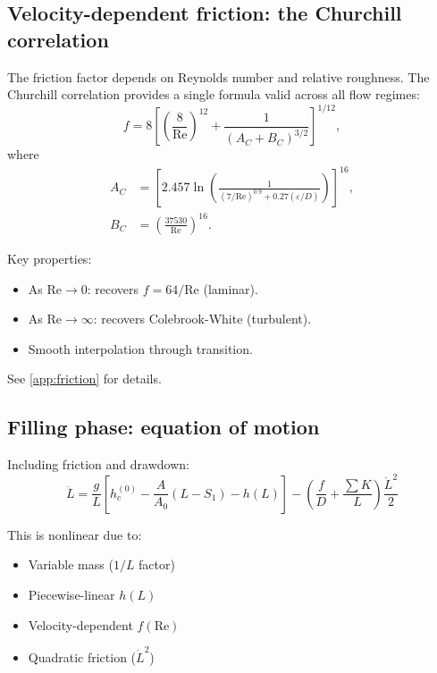 \documentclass[11pt]{article}
\begin{document}
\subsection{Velocity-dependent friction: the Churchill correlation}

The friction factor depends on Reynolds number and relative roughness. The Churchill correlation provides a single formula valid across all flow regimes:
\begin{equation}
  f = 8\left[\left(\frac{8}{\text{Re}}\right)^{12} + \frac{1}{(A_C + B_C)^{3/2}}\right]^{1/12},
  \label{eq:churchill}
\end{equation}
where
\begin{align}
  A_C &= \left[2.457 \ln\left(\frac{1}{(7/\text{Re})^{0.9} + 0.27(\varepsilon/D)}\right)\right]^{16}, \\
  B_C &= \left(\frac{37530}{\text{Re}}\right)^{16}.
\end{align}

Key properties:
\begin{itemize}[nosep,leftmargin=2em]
  \item As $\text{Re} \to 0$: recovers $f = 64/\text{Re}$ (laminar).
  \item As $\text{Re} \to \infty$: recovers Colebrook-White (turbulent).
  \item Smooth interpolation through transition.
\end{itemize}

See \cref{app:friction} for details.

\subsection{Filling phase: equation of motion}

Including friction and drawdown:
\begin{equation}
  \boxed{\ddot{L} = \frac{g}{L}\left[h_c^{(0)} - \frac{A}{A_0}(L - S_1) - h(L)\right] - \left(\frac{f}{D} + \frac{\sum K}{L}\right)\frac{\dot{L}^2}{2}}
  \label{eq:filling-ODE}
\end{equation}

This is nonlinear due to:
\begin{itemize}[nosep,leftmargin=2em]
  \item Variable mass ($1/L$ factor)
  \item Piecewise-linear $h(L)$
  \item Velocity-dependent $f(\text{Re})$
  \item Quadratic friction ($\dot{L}^2$)
\end{itemize}
\end{document}
